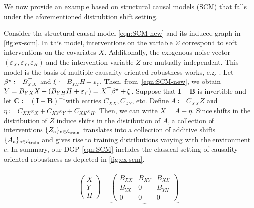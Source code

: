 We now provide an example based on structural causal models (SCM) that falls under the aforementioned distrubtion shift setting. 
\begin{example}
    Consider the structural causal model \eqref{eqn:SCM-new} and its induced graph in \cref{fig:ex-scm}. In this model, interventions on the variable $Z$ correspond to soft interventions on the covariates $X$. Additionally, the exogenous noise vector $(\varepsilon_X, \varepsilon_Y, \varepsilon_H)$ and the intervention variable $Z$ are mutually independent. This model is the basis of multiple causality-oriented robustness works, e.g. \citep{rothenhausler2021anchor,shen2023causalityoriented}.
    Let $\beta^{\star} \coloneqq B_{YX}^\top$ and $\xi \coloneqq B_{YH}H + \varepsilon_Y$. Then, from~\eqref{eqn:SCM-new}, we obtain $Y = B_{YX} X + (B_{YH} H + \varepsilon_Y)=X^\top\beta^{\star} + \xi$.
    Suppose that $\mathbf{I} - \mathbf{B}$ is invertible and let $\mathbf{C}\coloneqq (\mathbf{I} - \mathbf{B})^{-1}$with entries $C_{XX}, C_{XY}$, etc. Define $A \coloneqq C_{XX} Z$ and $\eta \coloneqq C_{XX} \varepsilon_X + C_{XY} \varepsilon_Y + C_{XH} \varepsilon_H$. Then, we can write $X = A + \eta$.
    Since shifts in the distribution of $Z$ induce shifts in the distribution of $A$, a collection of interventions $\{Z_e\}_{e \in \mathcal{E}_{\mathrm{train}}}$ translates into a collection of additive shifts $\{A_e\}_{e\in\mathcal{E}_{\mathrm{train}}}$ and gives rise to training distributions varying with the environment $e$. In summary, our DGP \eqref{eqn:SCM} includes the classical setting of causality-oriented robustness as depicted in \cref{fig:ex-scm}. 
    \begin{figure}[h!]\label{fig:fig1setting}
\begin{subfigure}{.55\textwidth}
\begin{align}
\label{eqn:SCM-new}
\begin{split}
    \begin{pmatrix}
        X\\
        Y\\
        H
    \end{pmatrix}
    =
    \underbrace{\begin{pmatrix}
        B_{XX} & B_{XY} & B_{XH}\\
        B_{YX} & 0 & B_{YH}\\
        0 & 0 & 0

\end{pmatrix}}
\end{split}
\end{align}
\end{subfigure}
\end{figure}
\end{example}
